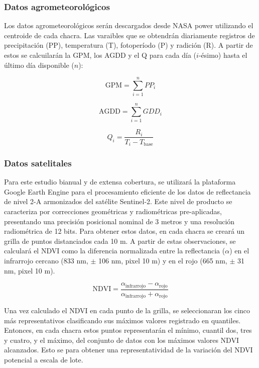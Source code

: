 \documentclass[
11pt, %
]{charter}
\begin{document}
\subsubsection{Datos agrometeorológicos}
\label{sec:descripcion}
Los datos agrometeorológicos serán descargados desde NASA power utilizando el centroide de cada chacra. Las varaibles que se obtendrán diariamente registros de precipitación (PP), temperatura (T), fotoperíodo (P) y radición (R). A partir de estos se calcuilarán la GPM, los AGDD y el Q para cada día ($i$-ésimo) hasta el último día disponible ($n$):

\begin{equation}
\label{eq:GPM}
\text{GPM} = \sum_{i=1}^{n} PP_{i}
\end{equation}

\begin{equation}
\label{eq:AGDD}
\text{AGDD} = \sum_{i=1}^{n} GDD_{i}
\end{equation}

\begin{equation}
\label{eq:Q}
Q_i = \frac{R_i}{T_i - T_{\text{base}}}
\end{equation}


\subsubsection{Datos satelitales}
\label{sec:descripcion}

Para este estudio bianual y de extensa cobertura, se utilizará la plataforma Google Earth Engine para el procesamiento eficiente de los datos de reflectancia de nivel 2-A armonizados del satélite Sentinel-2. Este nivel de producto se caracteriza por correcciones geométricas y radiométricas pre-aplicadas, presentando una precisión posicional nominal de 3 metros y una resolución radiométrica de 12 bits. Para obtener estos datos, en cada chacra se creará un grilla de puntos distanciados cada 10 m. A partir de estas observaciones, se calculará el NDVI como la diferencia normalizada entre la reflectancia ($\alpha$) en el infrarrojo cercano (833 nm, $\pm$ 106 nm, pixel 10 m) y en el rojo (665 nm, $\pm$ 31 nm, pixel 10 m). 

\begin{equation}
\text{NDVI} = \frac{\alpha_{\text{infrarrojo}} - \alpha_{\text{rojo}}}{\alpha_{\text{infrarrojo}} + \alpha_{\text{rojo}}} \label{eq:ndvi_def}
\end{equation}

Una vez calculado el NDVI en cada punto de la grilla, se seleccionaran los cinco más representativos clasificando sus máximos valores registrado en quantiles. Entonces, en cada chacra estos puntos representarán el mínimo, cuantil dos, tres y cuatro, y el máximo, del conjunto de datos con los máximos valores NDVI alcanzados. Esto se para obtener una representatividad de la variación del NDVI potencial a escala de lote.  
\end{document}
